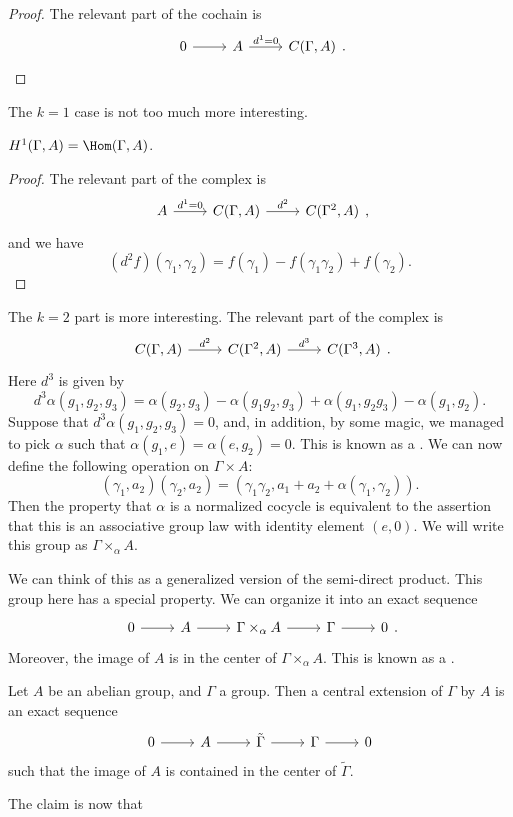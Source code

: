 \documentclass[a4paper]{article}
\begin{document}
\begin{proof}
  The relevant part of the cochain is
  \[
    \begin{tikzcd}
      0 \ar[r] & A \ar[r, "d^1 = 0"] & C(\Gamma, A)
    \end{tikzcd}.
  \]
\end{proof}

The $k = 1$ case is not too much more interesting.
\begin{prop}
  $H^1(\Gamma, A) = \Hom(\Gamma, A)$.
\end{prop}

\begin{proof}
  The relevant part of the complex is
  \[
    \begin{tikzcd}
      A \ar[r, "d^1 = 0"] & C(\Gamma, A) \ar[r, "d^2"] & C(\Gamma^2, A)
    \end{tikzcd},
  \]
  and we have
  \[
    (d^2 f) (\gamma_1, \gamma_2) = f(\gamma_1) - f(\gamma_1 \gamma_2) + f(\gamma_2).
  \]
\end{proof}

The $k = 2$ part is more interesting. The relevant part of the complex is
\[
  \begin{tikzcd}
    C(\Gamma, A) \ar[r, "d^2"] & C(\Gamma^2, A) \ar[r, "d^3"] & C(\Gamma^3, A)
  \end{tikzcd}.
\]
Here $d^3$ is given by
\[
  d^3 \alpha (g_1, g_2, g_3) = \alpha(g_2, g_3) - \alpha(g_1 g_2, g_3) + \alpha(g_1, g_2 g_3) - \alpha(g_1, g_2).
\]
Suppose that $d^3 \alpha (g_1, g_2, g_3) = 0$, and, in addition, by some magic, we managed to pick $\alpha$ such that $\alpha(g_1, e) = \alpha(e, g_2) = 0$. This is known as a . We can now define the following operation on $\Gamma \times A$:
\[
  (\gamma_1, a_2)(\gamma_2, a_2) = (\gamma_1 \gamma_2, a_1 +a _2 + \alpha (\gamma_1, \gamma_2)).
\]
Then the property that $\alpha$ is a normalized cocycle is equivalent to the assertion that this is an associative group law with identity element $(e, 0)$. We will write this group as $\Gamma \times_\alpha A$.

We can think of this as a generalized version of the semi-direct product. This group here has a special property. We can organize it into an exact sequence
\[
  \begin{tikzcd}
    0 \ar[r] & A \ar[r] & \Gamma \times_\alpha A \ar[r] & \Gamma \ar[r] & 0
  \end{tikzcd}.
\]
Moreover, the image of $A$ is in the center of $\Gamma \times_\alpha A$. This is known as a .
\begin{defi}
  Let $A$ be an abelian group, and $\Gamma$ a group. Then a central extension of $\Gamma$ by $A$ is an exact sequence
  \[
    \begin{tikzcd}
      0 \ar[r] & A \ar[r] & \tilde{\Gamma} \ar[r] & \Gamma \ar[r] & 0
    \end{tikzcd}
  \]
  such that the image of $A$ is contained in the center of $\tilde{\Gamma}$.
\end{defi}
The claim is now that
\end{document}
